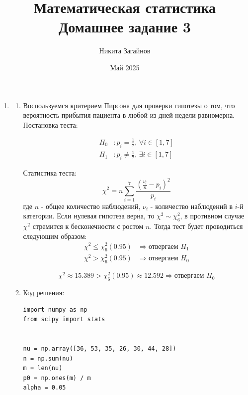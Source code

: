 \documentclass{article}
\title{Математическая статистика \\ Домашнее задание 3}
\author{Никита Загайнов}
\date{Май 2025}
\begin{document}
\maketitle

\begin{enumerate}
	\item \begin{enumerate}
		      \item
		            Воспользуемся критерием Пирсона для проверки гипотезы о том, что вероятность прибытия пациента в любой из дней недели равномерна. Постановка теста:

		            \begin{equation*}
			            \begin{aligned}
				            H_0 & : p_i = \frac{1}{7} \text{, } \forall i \in [1,7]    \\
				            H_1 & : p_i \neq \frac{1}{7} \text{, } \exists i \in [1,7]
			            \end{aligned}
		            \end{equation*}

		            Статистика теста:
		            \[
			            \chi^2 = n \sum_{i=1}^{7} \frac{\left( \frac{\nu_i}{n} - p_i \right)^2}{p_i}
		            \]
		            где $n$ - общее количество наблюдений, $\nu_i$ - количество наблюдений в $i$-й категории. Если нулевая гипотеза верна, то $\chi^2 \sim \chi^2_6$, в противном случае $\chi^2$ стремится к бесконечности с ростом $n$. Тогда тест будет проводиться следующим образом:
		            \begin{equation*}
			            \begin{aligned}
				            \chi^2 \leq \chi^2_6(0.95) & \Rightarrow \text{отвергаем } H_1 \\
				            \chi^2 > \chi^2_6(0.95)    & \Rightarrow \text{отвергаем } H_0
			            \end{aligned}
		            \end{equation*}

		            \[
			            \chi^2 \approx 15.389 > \chi^2_6(0.95) \approx 12.592 \Longrightarrow \text{отвергаем } H_0
		            \]

		      \item Код решения:
		            \begin{lstlisting}
import numpy as np
from scipy import stats


nu = np.array([36, 53, 35, 26, 30, 44, 28])
n = np.sum(nu)
m = len(nu)
p0 = np.ones(m) / m
alpha = 0.05


\end{lstlisting}
\end{enumerate}
\end{enumerate}
\end{document}
